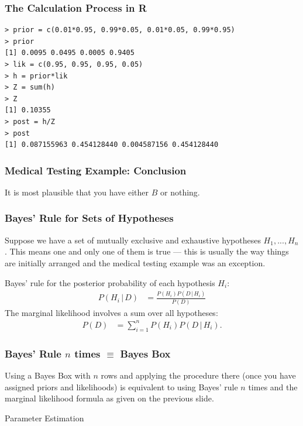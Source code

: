 \documentclass{beamer}
\newcommand{\given}{\,|\,}
\begin{document}
\begin{frame}[fragile]
\frametitle{The Calculation Process in R}

\begin{verbatim}
> prior = c(0.01*0.95, 0.99*0.05, 0.01*0.05, 0.99*0.95)
> prior
[1] 0.0095 0.0495 0.0005 0.9405
> lik = c(0.95, 0.95, 0.95, 0.05)
> h = prior*lik
> Z = sum(h)
> Z
[1] 0.10355
> post = h/Z
> post
[1] 0.087155963 0.454128440 0.004587156 0.454128440
\end{verbatim}

\end{frame}


\begin{frame}
\frametitle{Medical Testing Example: Conclusion}
It is most plausible that you have either $B$ or nothing.

\end{frame}


\begin{frame}
\frametitle{Bayes' Rule for Sets of Hypotheses}
Suppose we have a set of mutually exclusive and exhaustive hypotheses
$H_1, ..., H_n$. This means one and only one of them is true --- this is usually
the way things are initially arranged and the medical testing example was an
exception.\pause

Bayes' rule for the posterior probability of each hypothesis $H_i$:
\begin{align}
P(H_i \given D) &= \frac{P(H_i)P(D \given H_i)}{P(D)}
\end{align}\pause
The marginal likelihood involves a sum over all hypotheses:
\begin{align}
P(D) &= \sum_{i=1}^n P(H_i)P(D \given H_i).
\end{align}

\end{frame}


\begin{frame}
\frametitle{Bayes' Rule $n$ times $\equiv$ Bayes Box}
Using a Bayes Box with $n$ rows and applying the procedure there
(once you have assigned priors and likelihoods) is equivalent
to using Bayes' rule $n$ times and the marginal likelihood formula
as given on the previous slide.

\end{frame}

\begin{frame}

\begin{center}
\Large
Parameter Estimation
\end{center}

\end{frame}
\end{document}
